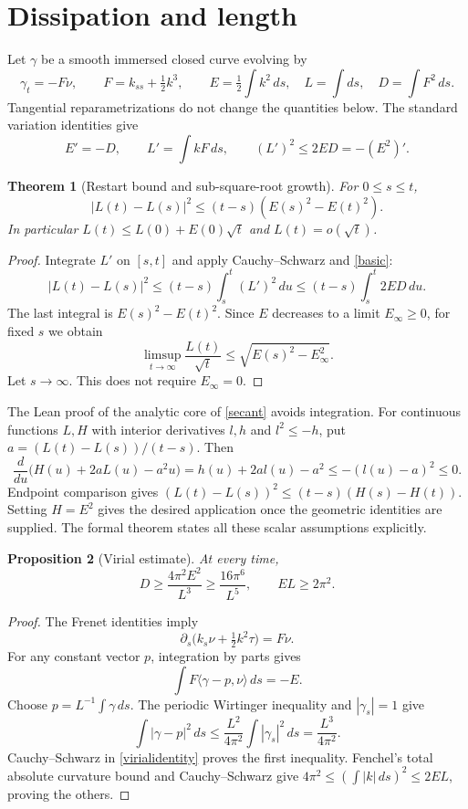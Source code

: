 \documentclass[11pt,a4paper]{article}
\newtheorem{theorem}{Theorem}
\newtheorem{proposition}[theorem]{Proposition}
\begin{document}
\section{Dissipation and length}
Let $\gamma$ be a smooth immersed closed curve evolving by
\[
 \gamma_t=-F\nu,\qquad F=k_{ss}+\tfrac12 k^3,
 \qquad E=\tfrac12\int k^2\,ds,\quad L=\int ds,
 \quad D=\int F^2\,ds.
\]
Tangential reparametrizations do not change the quantities below. The standard variation identities give
\begin{equation}\label{basic}
 E'=-D,\qquad L'=\int kF\,ds,\qquad
 (L')^2\le2ED=-(E^2)'.
\end{equation}

\begin{theorem}[Restart bound and sub-square-root growth]\label{restart}
For $0\le s\le t$,
\begin{equation}\label{secant}
 |L(t)-L(s)|^2\le(t-s)(E(s)^2-E(t)^2).
\end{equation}
In particular $L(t)\le L(0)+E(0)\sqrt t$ and $L(t)=o(\sqrt t)$.
\end{theorem}
\begin{proof}
Integrate $L'$ on $[s,t]$ and apply Cauchy--Schwarz and \eqref{basic}:
\[
 |L(t)-L(s)|^2\le(t-s)\int_s^t(L')^2\,du
 \le(t-s)\int_s^t2ED\,du.
\]
The last integral is $E(s)^2-E(t)^2$. Since $E$ decreases to a limit $E_\infty\ge0$, for fixed $s$ we obtain
\[
 \limsup_{t\to\infty}\frac{L(t)}{\sqrt t}
 \le\sqrt{E(s)^2-E_\infty^2}.
\]
Let $s\to\infty$. This does not require $E_\infty=0$.
\end{proof}

The Lean proof of the analytic core of \eqref{secant} avoids integration. For continuous functions $L,H$ with interior derivatives $l,h$ and $l^2\le-h$, put $a=(L(t)-L(s))/(t-s)$. Then
\[
 \frac{d}{du}\bigl(H(u)+2aL(u)-a^2u\bigr)
 =h(u)+2al(u)-a^2\le-(l(u)-a)^2\le0.
\]
Endpoint comparison gives $(L(t)-L(s))^2\le(t-s)(H(s)-H(t))$. Setting $H=E^2$ gives the desired application once the geometric identities are supplied. The formal theorem states all these scalar assumptions explicitly.

\begin{proposition}[Virial estimate]\label{virial}
At every time,
\begin{equation}\label{virialbound}
 D\ge\frac{4\pi^2 E^2}{L^3}\ge\frac{16\pi^6}{L^5},
 \qquad EL\ge2\pi^2.
\end{equation}
\end{proposition}
\begin{proof}
The Frenet identities imply
\[
 \partial_s\bigl(k_s\nu+\tfrac12k^2\tau\bigr)=F\nu.
\]
For any constant vector $p$, integration by parts gives
\begin{equation}\label{virialidentity}
 \int F\langle\gamma-p,\nu\rangle\,ds=-E.
\end{equation}
Choose $p=L^{-1}\int\gamma\,ds$. The periodic Wirtinger inequality and $|\gamma_s|=1$ give
\[
 \int|\gamma-p|^2\,ds\le\frac{L^2}{4\pi^2}\int|\gamma_s|^2\,ds
 =\frac{L^3}{4\pi^2}.
\]
Cauchy--Schwarz in \eqref{virialidentity} proves the first inequality. Fenchel's total absolute curvature bound and Cauchy--Schwarz give
$4\pi^2\le(\int|k|\,ds)^2\le2EL$, proving the others.
\end{proof}
\end{document}
